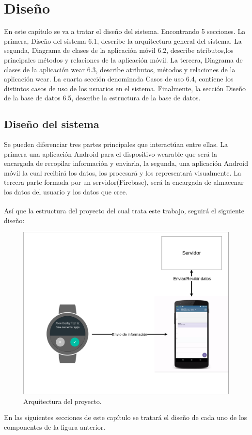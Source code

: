 \chapter{Diseño}

En este capítulo se va a tratar el diseño del sistema. Encontrando 5 secciones. La primera, Diseño del sistema 6.1, describe la arquitectura general del sistema. La segunda, Diagrama de clases de la aplicación móvil 6.2, describe atributos,los principales métodos y relaciones de la aplicación móvil. La tercera, Diagrama de clases de la aplicación wear 6.3, describe atributos, métodos y relaciones de la aplicación wear. La cuarta sección denominada Casos de uso 6.4, contiene los distintos casos de uso de los usuarios en el sistema. Finalmente, la sección Diseño de la base de datos 6.5, describe la estructura de la base de datos.

\section{Diseño del sistema}

Se pueden diferenciar tres partes principales que interactúan entre ellas. La primera una aplicación Android para el dispositivo wearable que será la encargada de recopilar información y enviarla, la segunda, una aplicación Android móvil la cual recibirá los datos, los procesará y los representará visualmente. La tercera parte formada por un servidor(Firebase), será la encargada de almacenar los datos del usuario y los datos que cree.\\
\\
Así que la estructura del proyecto del cual trata este trabajo,  seguirá el siguiente diseño:

\begin{figure}[H]
	\centering
	\includegraphics[scale=0.2]{imagenes/disa.png}
	\caption{Arquitectura del proyecto.}
	\label{Arquitectura del proyecto}
\end{figure}
\noindent
En las siguientes secciones de este capítulo se tratará el diseño de cada uno de los componentes de la figura anterior.

